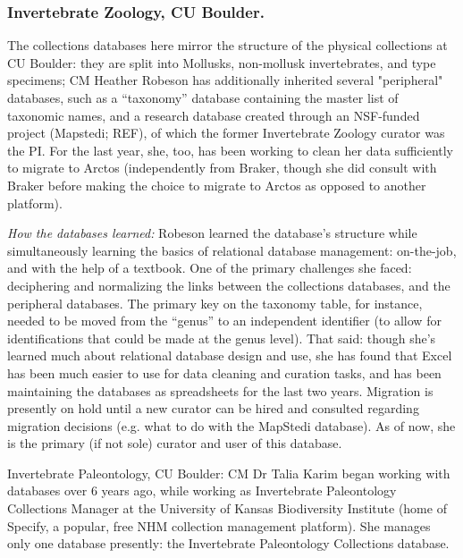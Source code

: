 \subsubsection{Invertebrate Zoology, CU Boulder.}

The collections databases here mirror the structure of the physical collections at CU Boulder: they are split into Mollusks, non-mollusk invertebrates, and type specimens; CM Heather Robeson has additionally inherited several "peripheral" databases, such as a “taxonomy” database containing the master list of taxonomic names, and a research database created through an NSF-funded project (Mapstedi; REF), of which the former Invertebrate Zoology curator was the PI.  For the last year, she, too, has been working to clean her data sufficiently to migrate to Arctos (independently from Braker, though she did consult with Braker before making the choice to migrate to Arctos as opposed to another platform). 

\textit{How the databases learned:} Robeson learned the database’s structure while simultaneously learning the basics of relational database management: on-the-job, and with the help of a textbook. One of the primary challenges she faced: deciphering and normalizing the links between the collections databases, and the peripheral databases.  The primary key on the taxonomy table, for instance, needed to be moved from the “genus” to an independent identifier (to allow for identifications that could be made at the genus level).  That said: though she’s learned much about relational database design and use, she has found that Excel has been much easier to use for data cleaning and curation tasks, and has been maintaining the databases as spreadsheets for the last two years.  Migration is presently on hold until a new curator can be hired and consulted regarding migration decisions (e.g. what to do with the MapStedi database).  As of now, she is the primary (if not sole) curator and user of this database.

Invertebrate Paleontology, CU Boulder: CM Dr Talia Karim began working with databases over 6 years ago, while working as Invertebrate Paleontology Collections Manager at the University of Kansas Biodiversity Institute (home of Specify, a popular, free NHM collection management platform). She manages only one database presently: the Invertebrate Paleontology Collections database.

